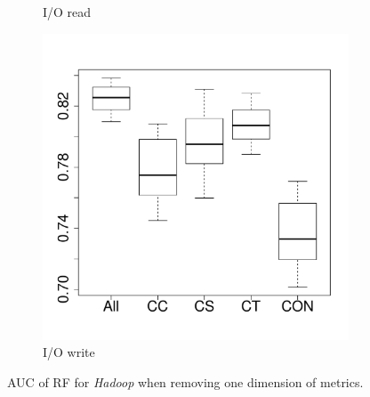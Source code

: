 \begin{figure}[t]
\begin{subfigure}{0.19\textwidth}
                \caption{I/O read}
        \end{subfigure}
        \begin{subfigure}{0.19\textwidth}
                \includegraphics[width=\linewidth]{Figures/iowrite-hadoopremove-importance.pdf}
                \caption{I/O write}
        \end{subfigure}
        
	\caption{AUC of RF for \emph{Hadoop} when removing one dimension of metrics.}
	\label{fig:importance-dimenssion-remove-hadoop}
\end{figure}

